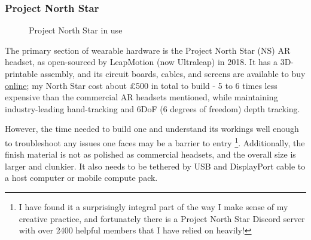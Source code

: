 \subsubsection{Project North Star}\label{sec: polaris-framework-hardware-pns}
\begin{figure}
    \centering
    \hfill
    \caption{Project North Star in use}
\end{figure}

The primary section of wearable hardware is the Project North Star (NS) AR headset, as open-sourced by LeapMotion (now Ultraleap) in 2018. It has a 3D-printable assembly, and its circuit boards, cables, and screens are available to buy \href{https://docs.projectnorthstar.org}{online}; my North Star cost about £500 in total to build - 5 to 6 times less expensive than the commercial AR headsets mentioned, while maintaining industry-leading hand-tracking and 6DoF (6 degrees of freedom) depth tracking.

However, the time needed to build one and understand its workings well enough to trouble\-shoot any issues one faces may be a barrier to entry \footnote{I have found it a surprisingly integral part of the way I make sense of my creative practice, and fortunately there is a Project North Star Discord server with over 2400 helpful members that I have relied on heavily!}. Additionally, the finish material is not as polished as commercial headsets, and the overall size is larger and clunkier. It also needs to be tethered by USB and DisplayPort cable to a host computer or mobile compute pack.


